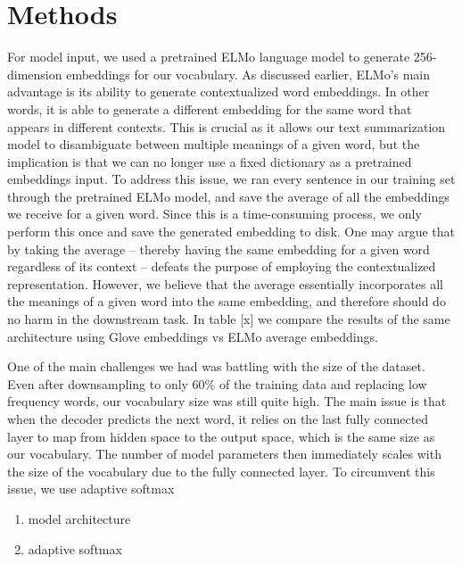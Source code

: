 \section{Methods}
\label{sec: method}


For model input, we used a pretrained ELMo language model \cite{peters2018deep} to generate 256-dimension embeddings for our vocabulary. As discussed earlier, ELMo's main advantage is its ability to generate contextualized word embeddings. In other words, it is able to generate a different embedding for the same word that appears in different contexts. This is crucial as it allows our text summarization model to disambiguate between multiple meanings of a given word, but the implication is that we can no longer use a fixed dictionary as a pretrained embeddings input. To address this issue, we ran every sentence in our training set through the pretrained ELMo model, and save the average of all the embeddings we receive for a given word. Since this is a time-consuming process, we only perform this once and save the generated embedding to disk. One may argue that by taking the average -- thereby having the same embedding for a given word regardless of its context -- defeats the purpose of employing the contextualized representation. However, we believe that the average essentially incorporates all the meanings of a given word into the same embedding, and therefore should do no harm in the downstream task.  In table [x]  we compare the results of the same architecture using Glove embeddings vs ELMo average embeddings. 

One of the main challenges we had was battling with the size of the dataset. Even after downsampling to only $60\%$ of the training data and replacing low frequency words, our vocabulary size was still quite high. The main issue is that when the decoder predicts the next word, it relies on the last fully connected layer to map from hidden space to the output space, which is the same size as our vocabulary. The number of model parameters then immediately scales with the size of the vocabulary due to the fully connected layer. To circumvent this issue, we use adaptive softmax 



\begin{enumerate}
\item model architecture
\item adaptive softmax 
\end{enumerate} 